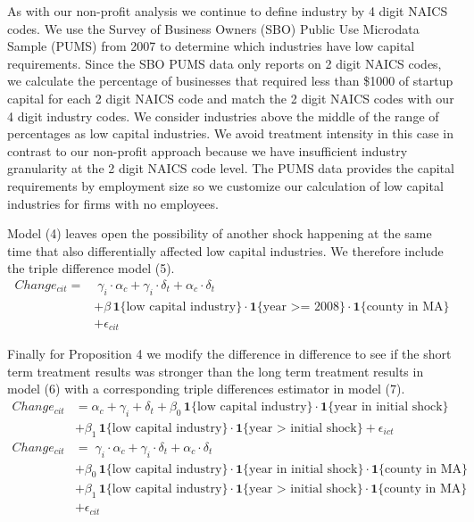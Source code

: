 \documentclass[12pt]{article}
\begin{document}
As with our non-profit analysis we continue to define industry by 4 digit NAICS codes. We use the Survey of Business Owners (SBO) Public Use Microdata Sample (PUMS) from 2007 to determine which industries have low capital requirements. Since the SBO PUMS data only reports on 2 digit NAICS codes, we calculate the percentage of businesses that required less than \$1000 of startup capital for each 2 digit NAICS code and match the 2 digit NAICS codes with our 4 digit industry codes. We consider industries above the middle of the range of percentages as low capital industries. We avoid treatment intensity in this case in contrast to our non-profit approach because we have insufficient industry granularity at the 2 digit NAICS code level. The PUMS data provides the capital requirements by employment size so we customize our calculation of low capital industries for firms with no employees. 

Model (4) leaves open the possibility of another shock happening at the same time that also differentially affected low capital industries. We therefore include the triple difference model (5). 
\begin{align}
Change_{cit} = & \; \gamma_i \cdot \alpha_c + \gamma_i \cdot \delta_t +  \alpha_c \cdot \delta_t \nonumber   \\
& + \beta \, \mathbf{1}\{\text{low capital industry}\} \cdot \mathbf{1}\{\text{year >= 2008}\}  \cdot \mathbf{1}\{\text{county in MA}\} \nonumber  \\
& + \epsilon_{cit}
\end{align}

Finally for Proposition 4 we modify the difference in difference to see if the short term treatment results was stronger than the long term treatment results in model (6) with a corresponding triple differences estimator in model (7). 
\begin{align}
Change_{cit} & =  \alpha_c + \gamma_i+ \delta_t  \nonumber + \beta_{0} \, \mathbf{1}\{\text{low capital industry}\} \cdot \mathbf{1}\{\text{year in initial shock}\} \nonumber \\
& + \beta_{1} \, \mathbf{1}\{\text{low capital industry}\} \cdot \mathbf{1}\{\text{year > initial shock}\} + \epsilon_{ict} \\
Change_{cit} & =  \; \gamma_i \cdot \alpha_c + \gamma_i \cdot \delta_t +  \alpha_c \cdot \delta_t \nonumber   \\
& + \beta_{0} \, \mathbf{1}\{\text{low capital industry}\} \cdot \mathbf{1}\{\text{year in initial shock}\}  \cdot \mathbf{1}\{\text{county in MA}\} \nonumber  \\
& + \beta_{1} \, \mathbf{1}\{\text{low capital industry}\} \cdot \mathbf{1}\{\text{year > initial shock}\}  \cdot \mathbf{1}\{\text{county in MA}\} \nonumber  \\
& + \epsilon_{cit}
\end{align}
\end{document}
